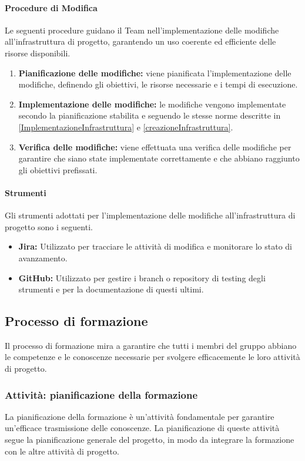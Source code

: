 \documentclass[a4paper,12pt]{article}
\begin{document}
\paragraph{Procedure di Modifica}
Le seguenti procedure guidano il Team nell'implementazione delle modifiche
all'infrastruttura di progetto, garantendo un uso coerente ed efficiente delle
risorse disponibili.
\begin{enumerate}
    \item \textbf{Pianificazione delle modifiche:} viene pianificata l'implementazione delle modifiche, definendo gli obiettivi, le risorse necessarie e i tempi di esecuzione.
    \item \textbf{Implementazione delle modifiche:} le modifiche vengono implementate secondo la pianificazione stabilita e seguendo le stesse norme descritte in \ref{ImplementazioneInfrastruttura} e \ref{creazioneInfrastruttura}.
    \item \textbf{Verifica delle modifiche:} viene effettuata una verifica delle modifiche per garantire che siano state implementate correttamente e che abbiano raggiunto gli obiettivi prefissati.
\end{enumerate}

\paragraph{Strumenti}
Gli strumenti adottati per l'implementazione delle modifiche all'infrastruttura
di progetto sono i seguenti.
\begin{itemize}
    \item \textbf{Jira:} Utilizzato per tracciare le attività di modifica e monitorare lo stato di avanzamento.
    \item \textbf{GitHub:} Utilizzato per gestire i branch o repository di testing degli strumenti e per la documentazione di questi ultimi.
\end{itemize}

\subsection{Processo di formazione}
Il processo di formazione mira a garantire che tutti i membri del gruppo
abbiano le competenze e le conoscenze necessarie per svolgere efficacemente le
loro attività di progetto.

\subsubsection{Attività: pianificazione della formazione}
La pianificazione della formazione è un'attività fondamentale per garantire
un'efficace trasmissione delle conoscenze. La pianificazione di queste attività
segue la pianificazione generale del progetto, in modo da integrare la
formazione con le altre attività di progetto.
\end{document}
